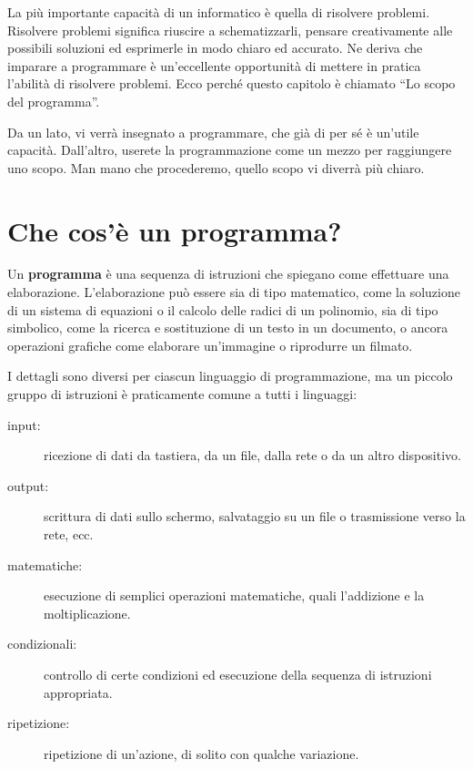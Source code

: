 \documentclass[10pt]{book}
\begin{document}
La più importante capacità di un informatico è quella di risolvere problemi. Risolvere problemi significa riuscire a schematizzarli, pensare creativamente alle possibili soluzioni ed esprimerle in modo chiaro ed accurato. Ne deriva che imparare a programmare è un'eccellente opportunità di mettere in pratica l'abilità di risolvere problemi. Ecco perché questo capitolo è chiamato ``Lo scopo del programma''.

Da un lato, vi verrà insegnato a programmare, che già di per sé è un'utile   capacità. Dall'altro, userete la programmazione come un mezzo per raggiungere   uno scopo. Man mano che procederemo, quello scopo vi diverrà più chiaro.


\section{Che cos'è un programma?}

Un {\bf programma} è una sequenza di istruzioni che spiegano come effettuare una elaborazione. L'elaborazione può essere sia di tipo matematico, come la soluzione di un sistema di equazioni o il calcolo delle radici di un polinomio, sia di tipo simbolico, come la ricerca e sostituzione di un testo in un documento, o ancora operazioni grafiche come elaborare un'immagine o riprodurre un filmato.

I dettagli sono diversi per ciascun linguaggio di programmazione, ma un piccolo gruppo di istruzioni è praticamente comune a tutti i linguaggi:

\begin{description}

\item[input:] ricezione di dati da tastiera, da un file, dalla rete o da un altro dispositivo.

\item[output:] scrittura di dati sullo schermo, salvataggio su un file o trasmissione verso la rete, ecc.

\item[matematiche:] esecuzione di semplici operazioni matematiche, quali        l'addizione e la moltiplicazione.

\item[condizionali:] controllo di certe condizioni ed esecuzione della       sequenza di istruzioni appropriata.

\item[ripetizione:] ripetizione di un'azione, di solito con qualche      variazione.

\end{description}
\end{document}
